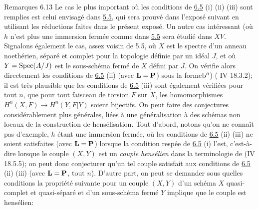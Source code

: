 \documentclass[10pt]{../fichiers-configuration-latex/smfart}
\begin{document}
\begin{enonce*}[remark]{Remarques 6.13}
Le cas le plus important où les conditions de \hyperref[XII.prop6.5]{6.5} (i) (ii) (iii) sont
remplies est celui envisagé dans \hyperref[XII.cor5.5]{5.5}, qui sera prouvé dans l'exposé
suivant en utilisant les réductions faites dans le présent exposé. Un
autre cas intéressant (où $h$ n'est plus une immersion fermée comme
dans \hyperref[XII.cor5.5]{5.5} sera étudié dans $XV$. Signalons également le cas, assez voisin
de 5.5, où $X$ est le spectre d'un anneau noethérien, séparé et
complet pour la topologie définie par un idéal $J$, et où $Y=\operatorname{Spec}
(A/J)$ est le sous-schéma fermé de $X$ défini par $J$. On vérifie
alors directement les conditions de \hyperref[XII.prop6.5]{6.5} (ii) (avec
$\mathbf{L}=\mathbf{P}$) sous la forme\pageoriginale ${\rm b''}$) (\EGA
IV 18.3.2); il est très plausible que les conditions de \hyperref[XII.prop6.5]{6.5} (iii) sont
également vérifiées pour tout $n$, \ie que pour tout faisceau de
torsion $F$ sur $X$, les homomorphismes $H^n(X,F)\rightarrow
H^n(Y,F|Y)$ soient bijectifs. On peut faire des conjectures
considérablement plus générales, liées à une généralisation à des
schémas non locaux de la construction de hensélisation. Tout d'abord,
notons qu'on ne connaît pas d'exemple, $h$ étant une immersion fermée,
où les conditions de \hyperref[XII.prop6.5]{6.5} (ii) (iii) ne soient satisfaites (avec
$\mathbf{L}=\mathbf{P}$) lorsque la condition respée de \hyperref[XII.prop6.5]{6.5} (i) l'est,
c'est-à-dire lorsque le couple $(X,Y)$ est un \emph{couple hensélien}
dans la terminologie de (\EGA IV 18.5.5); on peut donc conjecturer
qu'un tel couple satisfait aux conditions de \hyperref[XII.prop6.5]{6.5} (ii) (iii) (avec
$\mathbf{L}=\mathbf{P}$, tout $n$). D'autre part, on peut se demander
sous quelles conditions la propriété suivante pour un couple $(X,Y)$
d'un schéma $X$ quasi-complet et quasi-séparé et d'un sous-schéma
fermé $Y$ implique que le couple est hensélien:


\end{enonce*}
\end{document}
